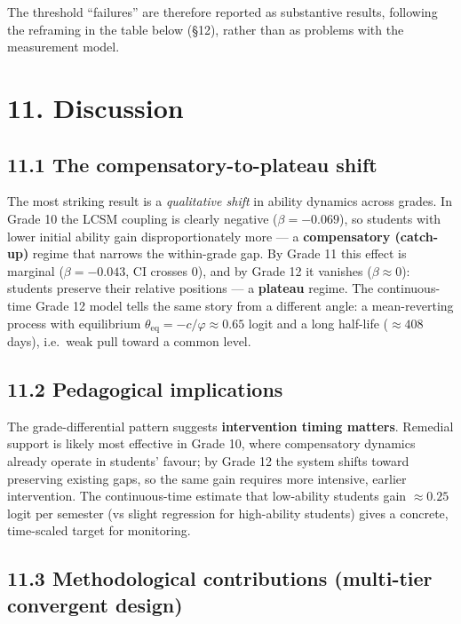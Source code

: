 \documentclass[
]{article}
\begin{document}
The threshold ``failures'' are therefore reported as substantive
results, following the reframing in the table below (§12), rather than
as problems with the measurement model.

\hypertarget{discussion}{%
\section{11. Discussion}\label{discussion}}

\hypertarget{the-compensatory-to-plateau-shift}{%
\subsection{11.1 The compensatory-to-plateau
shift}\label{the-compensatory-to-plateau-shift}}

The most striking result is a \emph{qualitative shift} in ability
dynamics across grades. In Grade 10 the LCSM coupling is clearly
negative (\(\beta = -0.069\)), so students with lower initial ability
gain disproportionately more --- a \textbf{compensatory (catch-up)}
regime that narrows the within-grade gap. By Grade 11 this effect is
marginal (\(\beta = -0.043\), CI crosses 0), and by Grade 12 it vanishes
(\(\beta \approx 0\)): students preserve their relative positions --- a
\textbf{plateau} regime. The continuous-time Grade 12 model tells the
same story from a different angle: a mean-reverting process with
equilibrium \(\theta_{\text{eq}} = -c/\varphi \approx 0.65\) logit and a
long half-life (\(\approx 408\) days), i.e.~weak pull toward a common
level.

\hypertarget{pedagogical-implications}{%
\subsection{11.2 Pedagogical
implications}\label{pedagogical-implications}}

The grade-differential pattern suggests \textbf{intervention timing
matters}. Remedial support is likely most effective in Grade 10, where
compensatory dynamics already operate in students' favour; by Grade 12
the system shifts toward preserving existing gaps, so the same gain
requires more intensive, earlier intervention. The continuous-time
estimate that low-ability students gain \(\approx 0.25\) logit per
semester (vs slight regression for high-ability students) gives a
concrete, time-scaled target for monitoring.

\hypertarget{methodological-contributions-multi-tier-convergent-design}{%
\subsection{11.3 Methodological contributions (multi-tier convergent
design)}\label{methodological-contributions-multi-tier-convergent-design}}
\end{document}
